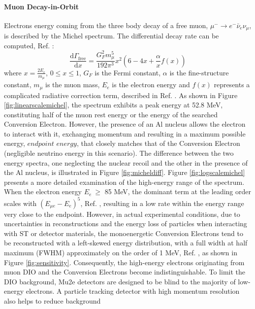 \paragraph{Muon Decay-in-Orbit}
Electrons energy coming from the three body decay of a free muon, 
$\mu^- \rightarrow e^- \bar{\nu}_e \nu_\mu$, is described by the Michel 
spectrum. The differential decay rate can be computed, Ref. \cite{michel}:
\begin{equation}
    \frac{\text{d}\Gamma_{\text{free}}}{\text{d}x}= \frac{G^2_F m^5_\mu}{192 \pi^3}x^2(6-4x+\frac{\alpha}{x}f(x)) 
\end{equation}
where $x=\frac{2 E_e}{m_\mu}$, $0\leq x\leq 1$, $G_F$ is the Fermi constant, 
$\alpha$ is the fine-structure constant, $m_\mu$ is the muon mass, $E_e$ is the 
electron energy and $f (x)$ represents a complicated radiative correction term, 
described in Ref. \cite{PhysRev.113.1652}. 
As shown in Figure \ref{fig:linearscalemichel}, the spectrum exhibits a peak energy 
at 52.8 MeV, constituting half of the muon rest energy  or the energy of the searched 
Conversion Electron. However, the presence of an Al nucleus allows the electron to 
interact with it, exchanging momentum and resulting in a maximum possible energy, 
$endpoint$ $energy$, that closely matches that of the Conversion Electron (negligible 
neutrino energy in this scenario). The difference between the two energy spectra, one 
neglecting the nuclear recoil and the 
other in the presence of the Al nucleus, is illustrated in Figure \ref{fig:micheldiff}. 
Figure \ref{fig:logscalemichel} presents a more detailed examination of the high-energy 
range of the spectrum. When the electron energy $E_e \ \geq$ 85 MeV, the dominant term 
at the leading order scales with $(E_{\mu e} - E_e)^5$, Ref. \cite{PhysRevD.84.013006}, 
resulting in a low rate within the energy range very close to the endpoint. However, in 
actual experimental conditions, due to uncertainties in reconstructions and the energy 
loss of particles when interacting with ST or detector materials, the monoenergetic 
Conversion Electrons tend to be reconstructed with a left-skewed energy distribution, 
with a full width at half maximum (FWHM) approximately on the order of 1 MeV, Ref. 
\cite{gaponenko}, as shown in Figure \ref{fig:sensitivity}. Consequently, the 
high-energy electrons originating from muon DIO and the Conversion Electrons 
become indistinguishable. To limit the DIO background, Mu2e detectors are 
designed to be blind to the majority of low-energy electrons. A particle 
tracking detector with high momentum resolution also helps to reduce background 

